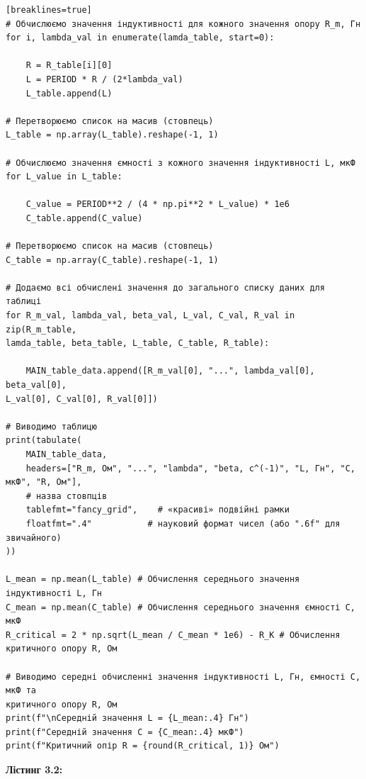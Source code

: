 \documentclass[12pt,a4paper]{article}
\begin{document}
{\begin{verbatim}[breaklines=true]
# Обчислюємо значення індуктивності для кожного значення опору R_m, Гн
for i, lambda_val in enumerate(lamda_table, start=0):

    R = R_table[i][0]
    L = PERIOD * R / (2*lambda_val)
    L_table.append(L)

# Перетворюємо список на масив (стовпець)
L_table = np.array(L_table).reshape(-1, 1)

# Обчислюємо значення ємності з кожного значення індуктивності L, мкФ
for L_value in L_table:

    C_value = PERIOD**2 / (4 * np.pi**2 * L_value) * 1e6
    C_table.append(C_value)

# Перетворюємо список на масив (стовпець)
C_table = np.array(C_table).reshape(-1, 1)

# Додаємо всі обчислені значення до загального списку даних для таблиці
for R_m_val, lambda_val, beta_val, L_val, C_val, R_val in zip(R_m_table,
lamda_table, beta_table, L_table, C_table, R_table):

    MAIN_table_data.append([R_m_val[0], "...", lambda_val[0], beta_val[0],
L_val[0], C_val[0], R_val[0]])

# Виводимо таблицю
print(tabulate(
    MAIN_table_data,
    headers=["R_m, Ом", "...", "lambda", "beta, c^(-1)", "L, Гн", "C, мкФ", "R, Ом"],
    # назва стовпців
    tablefmt="fancy_grid",    # «красиві» подвійні рамки
    floatfmt=".4"           # науковий формат чисел (або ".6f" для звичайного)
))

L_mean = np.mean(L_table) # Обчислення середнього значення індуктивності L, Гн
C_mean = np.mean(C_table) # Обчислення середнього значення ємності C, мкФ
R_critical = 2 * np.sqrt(L_mean / C_mean * 1e6) - R_K # Обчислення критичного опору R, Ом

# Виводимо середні обчисленні значення індуктивності L, Гн, ємності C, мкФ та
критичного опору R, Ом
print(f"\nСередній значення L = {L_mean:.4} Гн")
print(f"Середній значення C = {C_mean:.4} мкФ")
print(f"Критичний опір R = {round(R_critical, 1)} Ом")
    \end{verbatim}}

    \vspace{3em}

    \hypertarget{listing2}{}

    \textbf{\large Лістинг 3.2:}

    \vspace{1em}
\end{document}
